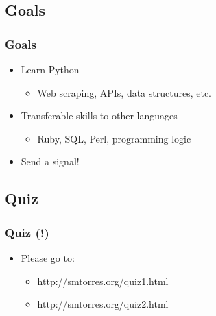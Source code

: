 \documentclass[xcolor=x11names,compress]{beamer}
\renewcommand{\(}{\begin{columns}}
\renewcommand{\)}{\end{columns}}
\newcommand{\<}[1]{\begin{column}{#1}}
\renewcommand{\>}{\end{column}}
\begin{document}
\subsection{Goals}
\begin{frame}
\frametitle{Goals}
\begin{itemize}
\item Learn Python
\begin{itemize}
\item Web scraping, APIs, data structures, etc.
\end{itemize}
\item Transferable skills to other languages
\begin{itemize}
\item Ruby, SQL, Perl, programming logic
\end{itemize}
\item Send a signal!
\end{itemize}
\end{frame}


\subsection{Quiz}
\begin{frame}
 \frametitle{Quiz (!)}
 \begin{itemize}
 	\item Please go to:
 	\begin{itemize}
 	\item http://smtorres.org/quiz1.html
	\item http://smtorres.org/quiz2.html	
	\end{itemize}
 \end{itemize}
\end{frame}
\end{document}
